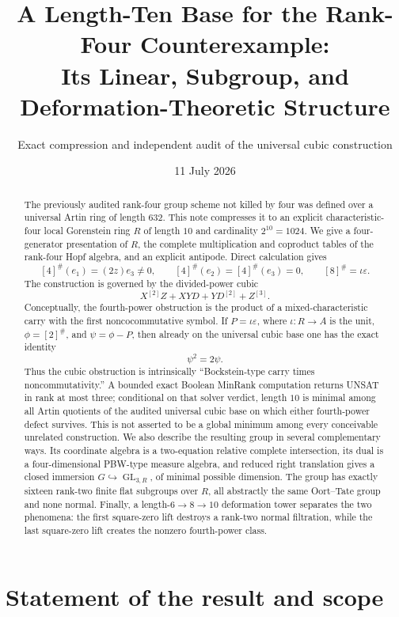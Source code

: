 \documentclass[11pt]{article}
\title{A Length-Ten Base for the Rank-Four Counterexample:\\
Its Linear, Subgroup, and Deformation-Theoretic Structure}
\author{Exact compression and independent audit of the universal cubic construction}
\date{11 July 2026}
\theoremstyle{remark}
\newcommand{\GL}{\operatorname{GL}}
\newcommand{\eps}{\varepsilon}
\begin{document}
\maketitle

\begin{abstract}
The previously audited rank-four group scheme not killed by four was defined
over a universal Artin ring of length \(632\).  This note compresses it to an
explicit characteristic-four local Gorenstein ring \(R\) of length \(10\)
and cardinality \(2^{10}=1024\).  We give a four-generator presentation of
\(R\), the complete multiplication and coproduct tables of the rank-four
Hopf algebra, and an explicit antipode.  Direct calculation gives
\[
 [4]^\#(e_1)=(2z)e_3\ne0,
 \qquad [4]^\#(e_2)=[4]^\#(e_3)=0,
 \qquad [8]^\#=\iota\eps.
\]
The construction is governed by the divided-power cubic
\[
 X^{[2]}Z+XYD+YD^{[2]}+Z^{[3]}.
\]
Conceptually, the fourth-power obstruction is the product of a
mixed-characteristic carry with the first noncocommutative symbol.  If
\(P=\iota\eps\), where \(\iota:R\to A\) is the unit, \(\phi=[2]^\#\), and
\(\psi=\phi-P\), then already on the
universal cubic base one has the exact identity
\[
 \psi^2=2\psi.
\]
Thus the cubic obstruction is intrinsically ``Bockstein-type carry times
noncommutativity.''  A bounded exact Boolean MinRank computation returns
UNSAT in rank at most three; conditional on that solver verdict, length
\(10\) is minimal among all Artin quotients of the audited universal cubic
base on which either fourth-power defect survives.  This is not asserted to
be a global minimum among every conceivable unrelated construction.  We
also describe the resulting group in several complementary ways.  Its
coordinate algebra is a two-equation relative complete intersection, its
dual is a four-dimensional PBW-type measure algebra, and reduced right
translation gives a closed immersion \(G\hookrightarrow\GL_{3,R}\), of
minimal possible dimension.  The group has exactly sixteen rank-two finite
flat subgroups over \(R\), all abstractly the same Oort--Tate group and none
normal.  Finally, a length-\(6\to8\to10\) deformation tower separates the two
phenomena: the first square-zero lift destroys a rank-two normal filtration,
while the last square-zero lift creates the nonzero fourth-power class.
\end{abstract}

\tableofcontents

\section{Statement of the result and scope}
\end{document}
